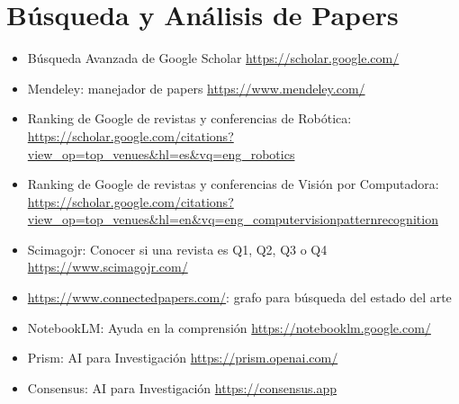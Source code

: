 \documentclass[a4paper,	11pt]{article}
\begin{document}
\section{Búsqueda y Análisis de Papers}
    \begin{itemize}
        \item Búsqueda Avanzada de Google Scholar \url{https://scholar.google.com/}
        \item Mendeley: manejador de papers \url{https://www.mendeley.com/}
        \item Ranking de Google de revistas y conferencias de Robótica: \url{https://scholar.google.com/citations?view_op=top_venues&hl=es&vq=eng_robotics}
        \item Ranking de Google de revistas y conferencias de Visión por Computadora: \url{https://scholar.google.com/citations?view_op=top_venues&hl=en&vq=eng_computervisionpatternrecognition}
        \item Scimagojr: Conocer si una revista es Q1, Q2, Q3 o Q4 \url{https://www.scimagojr.com/}
        \item \url{https://www.connectedpapers.com/}: grafo para búsqueda del estado del arte
        \item NotebookLM: Ayuda en la comprensión \url{https://notebooklm.google.com/}
        \item Prism: AI para Investigación \url{https://prism.openai.com/}
        \item Consensus: AI para Investigación \url{https://consensus.app}
    \end{itemize}
\end{document}
